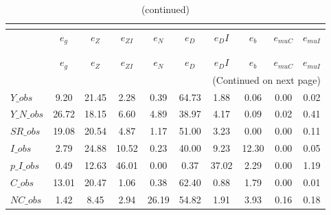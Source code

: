  
\begin{center}
\begin{longtable}{lccccccccc} 
\caption{VARIANCE DECOMPOSITION (in percent)}\\
 \label{Table:th_var_decomp_uncond}\\
\toprule 
$               $	 & 	 $        {e_g}$	 & 	 $        {e_Z}$	 & 	 $     {e_{ZI}}$	 & 	 $        {e_N}$	 & 	 $        {e_D}$	 & 	 $       {e_DI}$	 & 	 $        {e_b}$	 & 	 $    {e_{muC}}$	 & 	 $    {e_{muI}}$\\
\midrule \endfirsthead 
\caption{(continued)}\\
 \toprule \\ 
$               $	 & 	 $        {e_g}$	 & 	 $        {e_Z}$	 & 	 $     {e_{ZI}}$	 & 	 $        {e_N}$	 & 	 $        {e_D}$	 & 	 $       {e_DI}$	 & 	 $        {e_b}$	 & 	 $    {e_{muC}}$	 & 	 $    {e_{muI}}$\\
\midrule \endhead 
\midrule \multicolumn{10}{r}{(Continued on next page)} \\ \bottomrule \endfoot 
\bottomrule \endlastfoot 
$Y\_obs         $	 & 	         9.20	 & 	        21.45	 & 	         2.28	 & 	         0.39	 & 	        64.73	 & 	         1.88	 & 	         0.06	 & 	         0.00	 & 	         0.02 \\ 
$Y\_N\_obs      $	 & 	        26.72	 & 	        18.15	 & 	         6.60	 & 	         4.89	 & 	        38.97	 & 	         4.17	 & 	         0.09	 & 	         0.02	 & 	         0.41 \\ 
$SR\_obs        $	 & 	        19.08	 & 	        20.54	 & 	         4.87	 & 	         1.17	 & 	        51.00	 & 	         3.23	 & 	         0.00	 & 	         0.00	 & 	         0.11 \\ 
$I\_obs         $	 & 	         2.79	 & 	        24.88	 & 	        10.52	 & 	         0.23	 & 	        40.00	 & 	         9.23	 & 	        12.30	 & 	         0.00	 & 	         0.05 \\ 
$p\_I\_obs      $	 & 	         0.49	 & 	        12.63	 & 	        46.01	 & 	         0.00	 & 	         0.37	 & 	        37.02	 & 	         2.29	 & 	         0.00	 & 	         1.19 \\ 
$C\_obs         $	 & 	        13.01	 & 	        20.47	 & 	         1.06	 & 	         0.38	 & 	        62.40	 & 	         0.88	 & 	         1.79	 & 	         0.00	 & 	         0.01 \\ 
$NC\_obs        $	 & 	         1.42	 & 	         8.45	 & 	         2.94	 & 	        26.19	 & 	        54.82	 & 	         1.91	 & 	         3.93	 & 	         0.16	 & 	         0.18 \\ 

\end{longtable}
\end{center}
